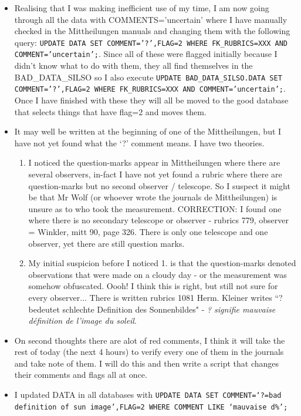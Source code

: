 \documentclass[12pt]{article}
\begin{document}
\begin{itemize}
    \item Realising that I was making inefficient use of my time, I am now going through all the data with COMMENTS='uncertain' where I have manually checked in the Mittheilungen manuals and changing them with the following query: \texttt{UPDATE DATA SET COMMENT='?',FLAG=2 WHERE FK\_RUBRICS=XXX AND COMMENT='uncertain';}. Since all of these were flagged initially because I didn't know what to do with them, they all find themselves in the BAD\_DATA\_SILSO so I also execute \texttt{UPDATE BAD\_DATA\_SILSO.DATA SET COMMENT='?',FLAG=2 WHERE FK\_RUBRICS=XXX AND COMMENT='uncertain';}. Once I have finished with these they will all be moved to the good database that selects things that have flag=2 and moves them.
    \item It may well be written at the beginning of one of the Mittheilungen, but I have not yet found what the `?' comment means. I have two theories.\label{what is flag 2 question mark}
    \begin{enumerate}
        \item I noticed the question-marks appear in Mittheilungen where there are several observers, in-fact I have not yet found a rubric where there are question-marks but no second observer / telescope. So I suspect it might be that Mr Wolf (or whoever wrote the journals de Mittheilungen) is unsure as to who took the measurement. CORRECTION: I found one where there is no secondary telescope or observer - rubrics 779, observer = Winkler, mitt 90, page 326. There is only one telescope and one observer, yet there are still question marks.
        \item My initial suspicion before I noticed 1. is that the question-marks denoted observations that were made on a cloudy day - or the measurement was somehow obfuscated. Oooh! I think this is right, but still not sure for every observer... There is written rubrics 1081 Herm. Kleiner writes ``? bedeutet schlechte Definition des Sonnenbildes" - \textit{? signifie mauvaise définition de l'image du soleil}.
    \end{enumerate}
    \item On second thoughts there are alot of red comments, I think it will take the rest of today (the next 4 hours) to verify every one of them in the journals and take note of them. I will do this and then write a script that changes their comments and flags all at once.
    \item I updated DATA in all databases with \texttt{UPDATE DATA SET COMMENT=`?=bad definition of sun image',FLAG=2 WHERE COMMENT LIKE `mauvaise d\%';}

\end{itemize}
\end{document}
